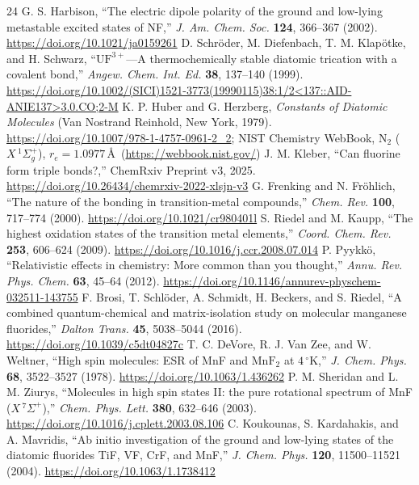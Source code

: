 \documentclass[10pt,twocolumn]{article}
\begin{document}
\begin{thebibliography}{24}
 G. S. Harbison, ``The electric dipole polarity of the ground and low-lying metastable excited states of NF,'' \textit{J. Am. Chem. Soc.} \textbf{124}, 366--367 (2002). \url{https://doi.org/10.1021/ja0159261}
 D. Schr\"oder, M. Diefenbach, T. M. Klap\"otke, and H. Schwarz, ``$\mathrm{UF}^{3+}$---A thermochemically stable diatomic trication with a covalent bond,'' \textit{Angew. Chem. Int. Ed.} \textbf{38}, 137--140 (1999). \url{https://doi.org/10.1002/(SICI)1521-3773(19990115)38:1/2<137::AID-ANIE137>3.0.CO;2-M}
 K. P. Huber and G. Herzberg, \textit{Constants of Diatomic Molecules} (Van Nostrand Reinhold, New York, 1979). \url{https://doi.org/10.1007/978-1-4757-0961-2_2}; NIST Chemistry WebBook, $\mathrm{N}_2$ ($X\,^1\Sigma_g^+$), $r_e=1.0977$\,\AA\ (\url{https://webbook.nist.gov/})
 J. M. Kleber, ``Can fluorine form triple bonds?,'' ChemRxiv Preprint v3, 2025. \url{https://doi.org/10.26434/chemrxiv-2022-xlsjn-v3}
 G. Frenking and N. Fr\"ohlich, ``The nature of the bonding in transition-metal compounds,'' \textit{Chem. Rev.} \textbf{100}, 717--774 (2000). \url{https://doi.org/10.1021/cr980401l}
 S. Riedel and M. Kaupp, ``The highest oxidation states of the transition metal elements,'' \textit{Coord. Chem. Rev.} \textbf{253}, 606--624 (2009). \url{https://doi.org/10.1016/j.ccr.2008.07.014}
 P. Pyykk\"o, ``Relativistic effects in chemistry: More common than you thought,'' \textit{Annu. Rev. Phys. Chem.} \textbf{63}, 45--64 (2012). \url{https://doi.org/10.1146/annurev-physchem-032511-143755}
 F. Brosi, T. Schl\"oder, A. Schmidt, H. Beckers, and S. Riedel, ``A combined quantum-chemical and matrix-isolation study on molecular manganese fluorides,'' \textit{Dalton Trans.} \textbf{45}, 5038--5044 (2016). \url{https://doi.org/10.1039/c5dt04827c}
 T. C. DeVore, R. J. Van Zee, and W. Weltner, ``High spin molecules: ESR of MnF and $\mathrm{MnF}_2$ at $4\,^\circ$K,'' \textit{J. Chem. Phys.} \textbf{68}, 3522--3527 (1978). \url{https://doi.org/10.1063/1.436262}
 P. M. Sheridan and L. M. Ziurys, ``Molecules in high spin states II: the pure rotational spectrum of MnF ($X\,^7\Sigma^+$),'' \textit{Chem. Phys. Lett.} \textbf{380}, 632--646 (2003). \url{https://doi.org/10.1016/j.cplett.2003.08.106}
 C. Koukounas, S. Kardahakis, and A. Mavridis, ``Ab initio investigation of the ground and low-lying states of the diatomic fluorides TiF, VF, CrF, and MnF,'' \textit{J. Chem. Phys.} \textbf{120}, 11500--11521 (2004). \url{https://doi.org/10.1063/1.1738412}

\end{thebibliography}
\end{document}
